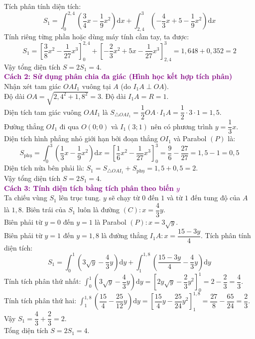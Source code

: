 \begin{ex}
{			Tích phân tính diện tích:
			$$S_1 = \int_0^{2{,}4} \left( \dfrac{3}{4}x - \dfrac{1}{9}x^2 \right) \mathrm{d}x + \int_{2{,}4}^3 \left( -\dfrac{4}{3}x + 5 - \dfrac{1}{9}x^2 \right) \mathrm{d}x$$
			Tính riêng từng phần hoặc dùng máy tính cầm tay, ta được:
			$$S_1 = \left[ \dfrac{3}{8}x^2 - \dfrac{1}{27}x^3 \right]_0^{2{,}4} + \left[ -\dfrac{2}{3}x^2 + 5x - \dfrac{1}{27}x^3 \right]_{2{,}4}^3 = 1{,}648 + 0{,}352 = 2$$
			Vậy tổng diện tích $S = 2S_1 = 4$.\\
		\noindent		
		\textbf{\textcolor{purple}{Cách 2: Sử dụng phân chia đa giác (Hình học kết hợp tích phân)}}\\
		Nhận xét tam giác $OAI_1$ vuông tại $A$ (do $I_1A \perp OA$).\\
		Độ dài $OA = \sqrt{2{,}4^2 + 1{,}8^2} = 3$. Độ dài $I_1A = R = 1$.\\
		Diện tích tam giác vuông $OAI_1$ là $S_{\triangle OAI_1} = \dfrac{1}{2} OA \cdot I_1A = \dfrac{1}{2} \cdot 3 \cdot 1 = 1{,}5$.\\
		Đường thẳng $OI_1$ đi qua $O(0;0)$ và $I_1(3;1)$ nên có phương trình $y = \dfrac{1}{3}x$.\\
		Diện tích hình phẳng nhỏ giới hạn bởi đoạn thẳng $OI_1$ và Parabol $(P)$ là:
			$$S_{\text{phụ}} = \int_0^3 \left( \dfrac{1}{3}x - \dfrac{1}{9}x^2 \right) \mathrm{d}x = \left[ \dfrac{1}{6}x^2 - \dfrac{1}{27}x^3 \right]_0^3 = \dfrac{9}{6} - \dfrac{27}{27} = 1{,}5 - 1 = 0{,}5$$
		Diện tích nửa bên phải là: $S_1 = S_{\triangle OAI_1} + S_{\text{phụ}} = 1{,}5 + 0{,}5 = 2$.\\
		Vậy tổng diện tích $S = 2S_1 = 4$.\\
		\noindent
		\textbf{\textcolor{purple}{Cách 3: Tính diện tích bằng tích phân theo biến $y$}}\\
		Ta chiếu vùng $S_1$ lên trục tung. $y$ sẽ chạy từ $0$ đến $1$ và từ $1$ đến tung độ của $A$ là $1{,}8$.
		Biên trái của $S_1$ luôn là đường $(C) \colon x = \dfrac{4}{3}y$.\\
		Biên phải từ $y=0$ đến $y=1$ là Parabol $(P) \colon x = 3\sqrt{y}$.\\
		Biên phải từ $y=1$ đến $y=1{,}8$ là đường thẳng $I_1A \colon x = \dfrac{15 - 3y}{4}$.
		Tích phân tính diện tích:
			$$S_1 = \int_0^1 \left( 3\sqrt{y} - \dfrac{4}{3}y \right) \mathrm{d}y + \int_1^{1{,}8} \left( \dfrac{15 - 3y}{4} - \dfrac{4}{3}y \right) \mathrm{d}y$$
		Tính tích phân thứ nhất: $\int_0^1 \left( 3\sqrt{y} - \dfrac{4}{3}y \right) \mathrm{d}y = \left[ 2y\sqrt{y} - \dfrac{2}{3}y^2 \right]_0^1 = 2 - \dfrac{2}{3} = \dfrac{4}{3}$.\\
		Tính tích phân thứ hai: $\int_1^{1{,}8} \left( \dfrac{15}{4} - \dfrac{25}{12}y \right) \mathrm{d}y = \left[ \dfrac{15}{4}y - \dfrac{25}{24}y^2 \right]_1^{1{,}8} = \dfrac{27}{8} - \dfrac{65}{24} = \dfrac{2}{3}$.\\
		Vậy $S_1 = \dfrac{4}{3} + \dfrac{2}{3} = 2$.\\
		Tổng diện tích $S = 2S_1 = 4$.
	}
\end{ex}
